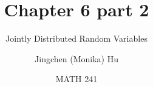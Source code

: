 \documentclass[slidestop,compress,mathserif]{beamer}
\title[Chapter 6 part 2]{Chapter 6 part 2}
\subtitle{Jointly Distributed Random Variables}
\author[Jingchen (Monika) Hu] %
{Jingchen (Monika) Hu}
\institute[Vassar] %
{Vassar College}
\date[MATH 241] %
{MATH 241}
\begin{document}
%



\begin{frame}%
\titlepage
\end{frame}


%
%
%
%
%
%
%
%
%
%
%
\end{document}
